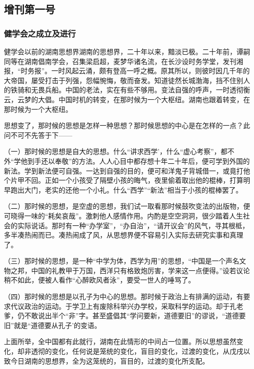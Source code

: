 \subsection[增刊第一号（一九一九年七月二十一日）]{增刊第一号}
\subsubsection{健学会之成立及进行}

健学会以前的湖南思想界湖南的思想界，二十年以来，黯淡已极。二十年前，谭嗣同等在湖南倡南学会，召集梁启超，麦梦华诸名流，在长沙设时务学堂，发刊湘报，“时务报”。一时风起云涌，颇有登高一呼之概。原其所以，则彼时因几千年的大帝国，屡受打击于列强，怨幅惋悔，敬而奋发。知道徒然长城渤海，挡不住别人的铁骑和无畏兵船。中国的老法，实在有些不够用。变法自强的呼声，一时透彻衡云，云梦的大倡。中国时机的转变，在那时候为一个大枢纽。湖南也跟着转变，在那时候为一个大枢纽。

思想变了，那时候的思想是怎样一种思想？那时候思想的中心是在怎样的一点？此问不可不先答于下——

（一）那时候的思想是自大的思想。什么“讲求西学’，什么“虚心考察”，都不外“学他到手还以奉敬”的方法。人人心目中都存想十年二十年后，便可学到外国的新法。学到新法便可自强。一达到自强的目的，便可和洋鬼子背城借一，或竟打他个片甲不回。正如一个小孩受了隔壁小孩的晦气，夜里偷着取出他的棍棒，打算明早跑出大门，老实的还他一个小礼。什么“西学”“新法”相当于小孩的棍棒罢了。

（二）那时候的思想，是空虚的思想，我们试一取看那时候鼓吹变法的出版物，便可晓得一味的“耗矣哀哉”。激刺他人感情作用。内酌是空空洞洞，很少踏着人生社会的实际说话。那时有一种“办学室”，“办自治”，“请开议会”的风气，寻其根柢，多半凑热闹而已。凑热闹成了风，从思想界便不容易引入实际去研究实事和真理了。

（三）那时候的思想，是一种“中学为体，西学为用”的思想，“中国是一个声名文物之邦，中国的礼教甲于万国，西洋只有格致炮厉害，学来这一点便得。”设若议论稍不如此，便被人看作“心醉欧风者泳”，要受一世人的唾骂了。

（四）那时候的思想是以孔子为中心的思想。那时候于政治上有排满的运动，有要求代议政治的运动。于学卫上有废除科举兴办学校，采取科学的运动。却于孔老爹，仍不敢说出半个“非”字。甚至盛倡其“学问要新，道德要旧”的谬说，“道德要旧”就是“道德要从孔子’的变语。

上面所举，全中国都有此就行，湖南在此情形的中间占一位置。所以思想虽然变化，却非透彻的变化，任何说是笼统的变化，盲目的变化，过渡的变化，从戊戌以致今日湖南的思想界，全为这笼统的，盲目的，过渡的变化所支配。

